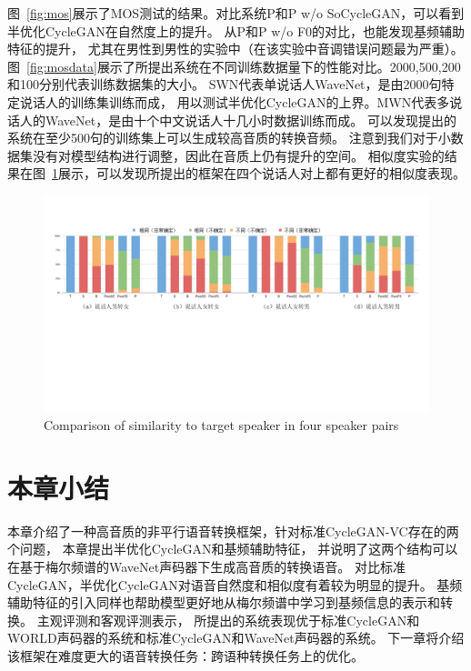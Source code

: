 图~\ref{fig:mos}展示了MOS测试的结果。对比系统P和P w/o SoCycleGAN，可以看到半优化CycleGAN在自然度上的提升。
从P和P w/o F0的对比，也能发现基频辅助特征的提升，
尤其在男性到男性的实验中（在该实验中音调错误问题最为严重）。
图~\ref{fig:mosdata}展示了所提出系统在不同训练数据量下的性能对比。2000,500,200和100分别代表训练数据集的大小。
SWN代表单说话人WaveNet，是由2000句特定说话人的训练集训练而成，
用以测试半优化CycleGAN的上界。MWN代表多说话人的WaveNet，是由十个中文说话人十几小时数据训练而成。
可以发现提出的系统在至少500句的训练集上可以生成较高音质的转换音频。
注意到我们对于小数据集没有对模型结构进行调整，因此在音质上仍有提升的空间。
相似度实验的结果在图~\ref{fig:sim}展示，可以发现所提出的框架在四个说话人对上都有更好的相似度表现。


\begin{figure}[!htp]
    \centering
    \includegraphics[width=14cm,trim=25 250 40 60,clip]{figure/4_sim.png}
    {Comparison of similarity to target speaker in four speaker pairs}
    \label{fig:sim}
\end{figure}

\section{本章小结}

本章介绍了一种高音质的非平行语音转换框架，针对标准CycleGAN-VC存在的两个问题，
本章提出半优化CycleGAN和基频辅助特征，
并说明了这两个结构可以在基于梅尔频谱的WaveNet声码器下生成高音质的转换语音。
对比标准CycleGAN，半优化CycleGAN对语音自然度和相似度有着较为明显的提升。
基频辅助特征的引入同样也帮助模型更好地从梅尔频谱中学习到基频信息的表示和转换。
主观评测和客观评测表示，
所提出的系统表现优于标准CycleGAN和WORLD声码器的系统和标准CycleGAN和WaveNet声码器的系统。
下一章将介绍该框架在难度更大的语音转换任务：跨语种转换任务上的优化。

